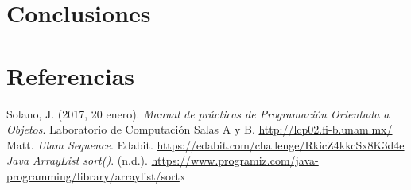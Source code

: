 \documentclass[11pt, twocolumn]{article}
\begin{document}
  \section*{Conclusiones}
  

  \section*{Referencias}
  \small
  Solano, J. (2017, 20 enero). \textit{Manual de prácticas de Programación Orientada a Objetos}. Laboratorio de Computación Salas A y B. \url{http://lcp02.fi-b.unam.mx/} \\

  Matt. \textit{Ulam Sequence}. Edabit. \url{https://edabit.com/challenge/RkicZ4kkcSx8K3d4e} \\

  \textit{Java ArrayList sort()}. (n.d.). \url{https://www.programiz.com/java-programming/library/arraylist/sort}x
\end{document}
